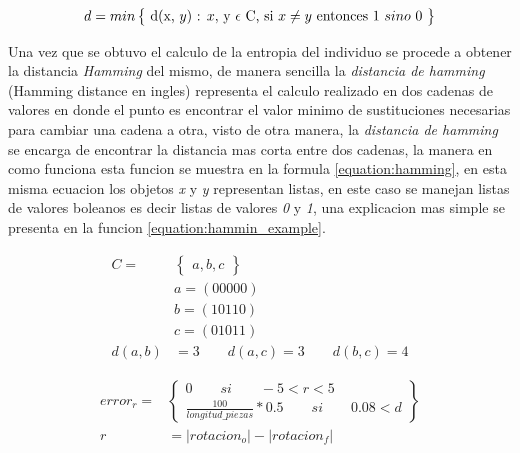 \begin{equation}
d = min \begin{Bmatrix} $ d(x, $ y)$ : $ x, $ y $ \epsilon $ C, si $ x \neq y $ entonces 1 $ sino $ 0 $ \end{Bmatrix}
\label{equation:hamming}
\end{equation}

Una vez que se obtuvo el calculo de la entropia del individuo se procede a
obtener la distancia \textit{Hamming} del mismo, de manera sencilla la
\textit{distancia de hamming} (Hamming distance en ingles) representa el calculo
realizado en dos cadenas de valores en donde el punto es encontrar el valor
minimo de sustituciones necesarias para cambiar una cadena a otra, visto de otra
manera, la \textit{distancia de hamming} se encarga de encontrar la distancia
mas corta entre dos cadenas, la manera en como funciona esta funcion se muestra
en la formula \ref{equation:hamming}, en esta misma ecuacion los objetos
\textit{x} y \textit{y} representan listas, en este caso se manejan listas de
valores boleanos es decir listas de valores \textit{0} y \textit{1}, una
explicacion mas simple se presenta en la funcion \ref{equation:hammin_example}.

\begin{equation}
  \begin{split}
    C = & \begin{Bmatrix} a, b, c \end{Bmatrix} \\
     & a = (00000) \\
     & b = (10110) \\
     & c = (01011) \\
     d(a, b) & = 3 \qquad d(a, c) = 3 \qquad d(b, c) = 4
  \end{split}
  \label{equation:hammin_example}
\end{equation}

\begin{equation}
  \begin{split}
    error_{r} = & 
    \begin{Bmatrix}
      0 \qquad si \qquad -5 < r < 5 \\ 
      \frac{100}{longitud\_piezas} * 0.5 \qquad si \qquad 0.08 < d
    \end{Bmatrix} \\
     r & = \left | rotacion_o \right | - \left | rotacion_f \right |
  \end{split}
  \label{equation:error_ang}
\end{equation}


